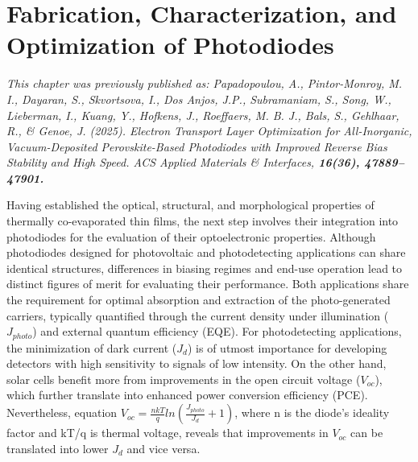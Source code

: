 \chapter{Fabrication, Characterization, and Optimization of  Photodiodes}\label{ch:transport_layer}

\textit{This chapter was previously published as: Papadopoulou, A., Pintor-Monroy, M. I., Dayaran, S., Skvortsova, I., Dos Anjos, J.P., Subramaniam, S., Song, W., Lieberman, I., Kuang, Y., Hofkens, J., Roeffaers, M. B. J., Bals, S., Gehlhaar, R., \& Genoe, J. (2025). Electron Transport Layer Optimization for All-Inorganic, Vacuum-Deposited Perovskite-Based Photodiodes with Improved Reverse Bias Stability and High Speed. ACS Applied Materials \& Interfaces, \textbf{16(36), 47889–47901.}}

\vspace{2em}

Having established the optical, structural, and morphological properties of thermally co-evaporated  thin films, the next step involves their integration into photodiodes for the evaluation of their optoelectronic properties. Although photodiodes designed for photovoltaic and photodetecting applications can share identical structures, differences in biasing regimes and end-use operation lead to distinct figures of merit for evaluating their performance. Both applications share the requirement for optimal absorption and extraction of the photo-generated carriers, typically quantified through the current density under illumination ($J_{photo}$) and external quantum efficiency (EQE). For photodetecting applications, the minimization of dark current ($J_d$) is of utmost importance for developing detectors with high sensitivity to signals of low intensity. On the other hand, solar cells benefit more from improvements in the open circuit voltage ($V_{oc}$), which further translate into enhanced power conversion efficiency (PCE). Nevertheless, equation $V_{oc} = \frac{nkT}{q}ln(\frac{J_{photo}}{J_{d}}+1)$, where n is the diode's ideality factor and kT/q is thermal voltage, reveals that improvements in $V_{oc}$ can be translated into lower $J_d$ and vice versa. 

